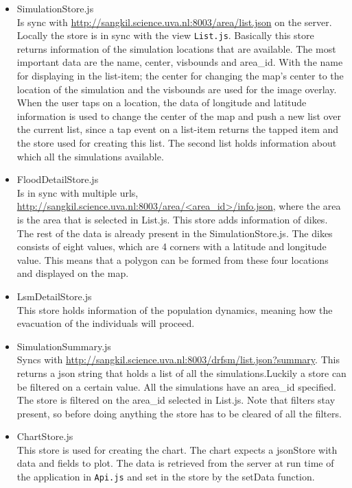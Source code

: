 \begin{itemize}
\item SimulationStore.js \\
Is sync with \url{http://sangkil.science.uva.nl:8003/area/list.json} on the server. Locally the store is in sync with the view \texttt{List.js}. Basically this store returns information of the simulation locations that are available. The most important data are the name, center, visbounds and area\_id. With the name for displaying in the list-item; the center for changing the map's center to the location of the simulation and the visbounds are used for the image overlay. When the user taps on a location, the data of longitude and latitude information is used to change the center of the map and push a new list over the current list, since a tap event on a list-item returns the tapped item and the store used for creating this list. The second list holds information about which all the simulations available.
\item FloodDetailStore.js \\
Is in sync with multiple urls, \url{http://sangkil.science.uva.nl:8003/area/<area\_id>/info.json}, where the area is the area that is selected in List.js. This store adds information of dikes. The rest of the data is already present in the SimulationStore.js. The dikes consists of eight values, which are 4 corners with a latitude and longitude value. This means that a polygon can be formed from these four locations and displayed on the map.
\item LsmDetailStore.js \\
This store holds information of the population dynamics, meaning how the evacuation of the individuals will proceed. 
\item SimulationSummary.js \\
Syncs with \url{http://sangkil.science.uva.nl:8003/drfsm/list.json?summary}. This returns a json string that holds a list of all the simulations.Luckily a store can be filtered on a certain value. All the simulations have an area\_id specified. The store is filtered on the area\_id selected in List.js. Note that filters stay present, so before doing anything the store has to be cleared of all the filters.
\item ChartStore.js \\
This store is used for creating the chart. The chart expects a jsonStore with data and fields to plot. The data is retrieved from the server at run time of the application in \texttt{Api.js} and set in the store by the setData function.
\end{itemize}
